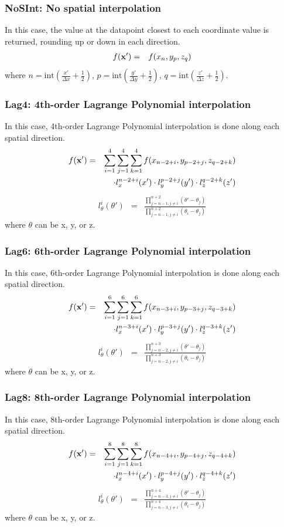 \documentclass[11pt]{article}
\def\bea{\begin{eqnarray}}
\def\eea{\end{eqnarray}}
\begin{document}
\subsubsection*{NoSInt: No spatial  interpolation}
\label{sec-noint}
In this case, the value at the datapoint closest to each
coordinate value is returned, rounding up or down in each
direction. \bea f({\bf x'}) &=& f(x_n,y_p,z_q)\eea where
$n=\textrm{int}(\frac{x'}{\Delta x}+\frac{1}{2})$,
$p=\textrm{int}(\frac{y'}{\Delta y}+\frac{1}{2})$,
$q=\textrm{int}(\frac{z'}{\Delta z}+\frac{1}{2})$.


\subsubsection*{Lag4: 4th-order Lagrange Polynomial interpolation}

In this case, 4th-order Lagrange Polynomial interpolation is done along each spatial direction.
\bea f({\bf x'}) &=&
\sum_{i=1}^4\sum_{j=1}^4\sum_{k=1}^4f(x_{n-2+i},y_{p-2+j},z_{q-2+k})\nonumber\\
&&\cdot l_x^{n-2+i}(x')\cdot l_y^{p-2+j}(y')\cdot
l_z^{q-2+k}(z')\eea \bea l_\theta^i(\theta') &=&
\frac{\prod\limits_{j=n-1,j\neq
i}^{n+2}(\theta'-\theta_j)}{\prod\limits_{j=n-1,j\neq
i}^{n+2}(\theta_i-\theta_j)}\eea where $\theta$ can be x, y, or z.

\subsubsection*{Lag6: 6th-order Lagrange Polynomial interpolation}

In this case, 6th-order Lagrange Polynomial interpolation is done along each spatial direction.
\bea f({\bf x'}) &=&
\sum_{i=1}^6\sum_{j=1}^6\sum_{k=1}^6f(x_{n-3+i},y_{p-3+j},z_{q-3+k})\nonumber\\
&&\cdot l_x^{n-3+i}(x')\cdot l_y^{p-3+j}(y')\cdot
l_z^{q-3+k}(z')\eea \bea l_\theta^i(\theta') &=&
\frac{\prod\limits_{j=n-2,j\neq
i}^{n+3}(\theta'-\theta_j)}{\prod\limits_{j=n-2,j\neq
i}^{n+3}(\theta_i-\theta_j)}\eea where $\theta$ can be x, y, or z.

\subsubsection*{Lag8: 8th-order Lagrange Polynomial interpolation}

In this case, 8th-order Lagrange Polynomial interpolation is done along each spatial direction.
\bea f({\bf x'}) &=&
\sum_{i=1}^8\sum_{j=1}^8\sum_{k=1}^8f(x_{n-4+i},y_{p-4+j},z_{q-4+k})\nonumber\\
&&\cdot l_x^{n-4+i}(x')\cdot l_y^{p-4+j}(y')\cdot
l_z^{q-4+k}(z')\eea \bea l_\theta^i(\theta') &=&
\frac{\prod\limits_{j=n-3,j\neq
i}^{n+4}(\theta'-\theta_j)}{\prod\limits_{j=n-3,j\neq
i}^{n+4}(\theta_i-\theta_j)}\eea where $\theta$ can be x, y, or z.
\end{document}
